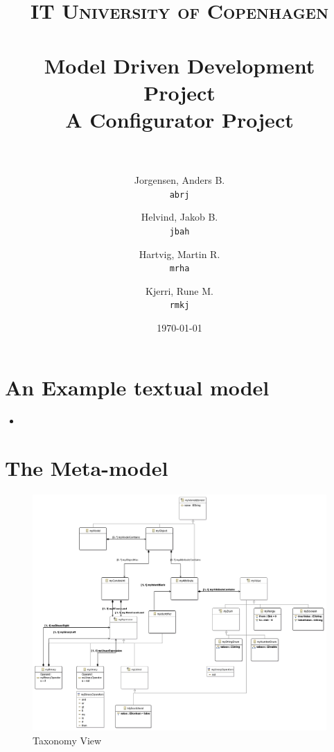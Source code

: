 \documentclass[paper=a4, fontsize=11pt]{scrartcl} %
\title{	
\normalfont \normalsize 
\textsc{IT University of Copenhagen} \\ [25pt] %
\horrule{0.5pt} \\[0.4cm] %
\huge Model Driven Development Project \\ %
\large A Configurator Project \\ %
\horrule{2pt} \\[0.5cm] %
}
\author{
  Jorgensen, Anders B.\\
  \texttt{abrj}
  \and
  Helvind, Jakob B.\\
  \texttt{jbah}
  \and
  Hartvig, Martin R.\\
  \texttt{mrha}
  \and
  Kjerri, Rune M.\\
  \texttt{rmkj}
}
\date{\normalsize\today} %
\numberwithin{equation}{section} %
\numberwithin{figure}{section} %
\numberwithin{table}{section} %
\newcommand{\java}[2]{
\begin{itemize}
\item[]
\end{itemize}
}
\begin{document}
\maketitle %
\newpage


\section{An Example textual model}
\java{../configproject/runtime-CarFactory/src/factory.smdpdsl}{Concrete syntax of a CarFactory}

\section{The Meta-model}
\begin{figure}[H]
\centering
\includegraphics[scale=0.65]{pictures/metamodel.png}
\caption{Taxonomy View}
\end{figure}
\end{document}
